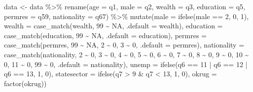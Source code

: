 \documentclass[
  letterpaper,
  DIV=11,
  numbers=noendperiod]{scrartcl}
\newenvironment{Shaded}{\begin{snugshade}}{\end{snugshade}}
\newcommand{\AttributeTok}[1]{\textcolor[rgb]{0.40,0.45,0.13}{#1}}
\newcommand{\ConstantTok}[1]{\textcolor[rgb]{0.56,0.35,0.01}{#1}}
\newcommand{\DecValTok}[1]{\textcolor[rgb]{0.68,0.00,0.00}{#1}}
\newcommand{\FunctionTok}[1]{\textcolor[rgb]{0.28,0.35,0.67}{#1}}
\newcommand{\NormalTok}[1]{\textcolor[rgb]{0.00,0.23,0.31}{#1}}
\newcommand{\OtherTok}[1]{\textcolor[rgb]{0.00,0.23,0.31}{#1}}
\newcommand{\SpecialCharTok}[1]{\textcolor[rgb]{0.37,0.37,0.37}{#1}}
\begin{document}
\begin{Shaded}
\begin{Highlighting}[]
\NormalTok{data }\OtherTok{\textless{}{-}}\NormalTok{ data }\SpecialCharTok{\%\textgreater{}\%} 
  \FunctionTok{rename}\NormalTok{(}\AttributeTok{age =}\NormalTok{ q1,}
         \AttributeTok{male =}\NormalTok{ q2,}
         \AttributeTok{wealth =}\NormalTok{ q3,}
         \AttributeTok{education =}\NormalTok{ q5,}
         \AttributeTok{permres =}\NormalTok{ q59,}
         \AttributeTok{nationality =}\NormalTok{ q67) }\SpecialCharTok{\%\textgreater{}\%} 
  \FunctionTok{mutate}\NormalTok{(}\AttributeTok{male =} \FunctionTok{ifelse}\NormalTok{(male }\SpecialCharTok{==} \DecValTok{2}\NormalTok{, }\DecValTok{0}\NormalTok{, }\DecValTok{1}\NormalTok{),}
         \AttributeTok{wealth =} \FunctionTok{case\_match}\NormalTok{(wealth, }\DecValTok{99} \SpecialCharTok{\textasciitilde{}} \ConstantTok{NA}\NormalTok{, }\AttributeTok{.default =}\NormalTok{ wealth),}
         \AttributeTok{education =} \FunctionTok{case\_match}\NormalTok{(education, }\DecValTok{99} \SpecialCharTok{\textasciitilde{}} \ConstantTok{NA}\NormalTok{, }\AttributeTok{.default =}\NormalTok{ education),}
         \AttributeTok{permres =} \FunctionTok{case\_match}\NormalTok{(permres, }\DecValTok{99} \SpecialCharTok{\textasciitilde{}} \ConstantTok{NA}\NormalTok{, }\DecValTok{2} \SpecialCharTok{\textasciitilde{}} \DecValTok{0}\NormalTok{, }\DecValTok{3} \SpecialCharTok{\textasciitilde{}} \DecValTok{0}\NormalTok{, }
                              \AttributeTok{.default =}\NormalTok{ permres),}
       \AttributeTok{nationality =} \FunctionTok{case\_match}\NormalTok{(nationality, }\DecValTok{2} \SpecialCharTok{\textasciitilde{}} \DecValTok{0}\NormalTok{, }\DecValTok{3} \SpecialCharTok{\textasciitilde{}} \DecValTok{0}\NormalTok{, }\DecValTok{4} \SpecialCharTok{\textasciitilde{}} \DecValTok{0}\NormalTok{, }\DecValTok{5} \SpecialCharTok{\textasciitilde{}} \DecValTok{0}\NormalTok{,}
                                \DecValTok{6} \SpecialCharTok{\textasciitilde{}} \DecValTok{0}\NormalTok{, }\DecValTok{7} \SpecialCharTok{\textasciitilde{}} \DecValTok{0}\NormalTok{, }\DecValTok{8} \SpecialCharTok{\textasciitilde{}} \DecValTok{0}\NormalTok{, }\DecValTok{9} \SpecialCharTok{\textasciitilde{}} \DecValTok{0}\NormalTok{, }\DecValTok{10} \SpecialCharTok{\textasciitilde{}} \DecValTok{0}\NormalTok{, }\DecValTok{11} \SpecialCharTok{\textasciitilde{}} \DecValTok{0}\NormalTok{,}
                                \DecValTok{99} \SpecialCharTok{\textasciitilde{}} \DecValTok{0}\NormalTok{, }\AttributeTok{.default =}\NormalTok{ nationality),}
       \AttributeTok{unemp =} \FunctionTok{ifelse}\NormalTok{(q6 }\SpecialCharTok{==} \DecValTok{11} \SpecialCharTok{|}\NormalTok{ q6 }\SpecialCharTok{==} \DecValTok{12} \SpecialCharTok{|}\NormalTok{ q6 }\SpecialCharTok{==} \DecValTok{13}\NormalTok{, }\DecValTok{1}\NormalTok{, }\DecValTok{0}\NormalTok{),}
       \AttributeTok{statesector =} \FunctionTok{ifelse}\NormalTok{(q7 }\SpecialCharTok{\textgreater{}} \DecValTok{9} \SpecialCharTok{\&}\NormalTok{ q7 }\SpecialCharTok{\textless{}} \DecValTok{13}\NormalTok{, }\DecValTok{1}\NormalTok{, }\DecValTok{0}\NormalTok{),}
       \AttributeTok{okrug =} \FunctionTok{factor}\NormalTok{(okrug))}


\end{Highlighting}
\end{Shaded}
\end{document}
